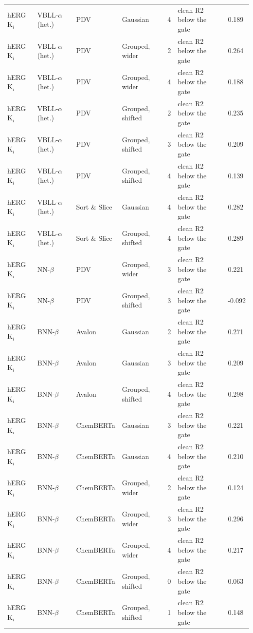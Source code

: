 {\begin{longtable}{llllcll}
hERG K$_i$ & VBLL-$\alpha$ (het.) & PDV & Gaussian & 4 & clean R2 below the gate & 0.189 \\
hERG K$_i$ & VBLL-$\alpha$ (het.) & PDV & Grouped, wider & 2 & clean R2 below the gate & 0.264 \\
hERG K$_i$ & VBLL-$\alpha$ (het.) & PDV & Grouped, wider & 4 & clean R2 below the gate & 0.188 \\
hERG K$_i$ & VBLL-$\alpha$ (het.) & PDV & Grouped, shifted & 2 & clean R2 below the gate & 0.235 \\
hERG K$_i$ & VBLL-$\alpha$ (het.) & PDV & Grouped, shifted & 3 & clean R2 below the gate & 0.209 \\
hERG K$_i$ & VBLL-$\alpha$ (het.) & PDV & Grouped, shifted & 4 & clean R2 below the gate & 0.139 \\
hERG K$_i$ & VBLL-$\alpha$ (het.) & Sort \& Slice & Gaussian & 4 & clean R2 below the gate & 0.282 \\
hERG K$_i$ & VBLL-$\alpha$ (het.) & Sort \& Slice & Grouped, shifted & 4 & clean R2 below the gate & 0.289 \\
hERG K$_i$ & NN-$\beta$ & PDV & Grouped, wider & 3 & clean R2 below the gate & 0.221 \\
hERG K$_i$ & NN-$\beta$ & PDV & Grouped, shifted & 3 & clean R2 below the gate & -0.092 \\
hERG K$_i$ & BNN-$\beta$ & Avalon & Gaussian & 2 & clean R2 below the gate & 0.271 \\
hERG K$_i$ & BNN-$\beta$ & Avalon & Gaussian & 3 & clean R2 below the gate & 0.209 \\
hERG K$_i$ & BNN-$\beta$ & Avalon & Grouped, shifted & 4 & clean R2 below the gate & 0.298 \\
hERG K$_i$ & BNN-$\beta$ & ChemBERTa & Gaussian & 3 & clean R2 below the gate & 0.221 \\
hERG K$_i$ & BNN-$\beta$ & ChemBERTa & Gaussian & 4 & clean R2 below the gate & 0.210 \\
hERG K$_i$ & BNN-$\beta$ & ChemBERTa & Grouped, wider & 2 & clean R2 below the gate & 0.124 \\
hERG K$_i$ & BNN-$\beta$ & ChemBERTa & Grouped, wider & 3 & clean R2 below the gate & 0.296 \\
hERG K$_i$ & BNN-$\beta$ & ChemBERTa & Grouped, wider & 4 & clean R2 below the gate & 0.217 \\
hERG K$_i$ & BNN-$\beta$ & ChemBERTa & Grouped, shifted & 0 & clean R2 below the gate & 0.063 \\
hERG K$_i$ & BNN-$\beta$ & ChemBERTa & Grouped, shifted & 1 & clean R2 below the gate & 0.148 \\

\end{longtable}}
